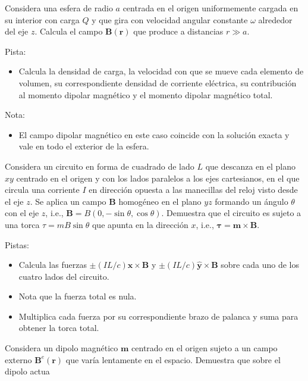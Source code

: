 \documentclass{exam}
\begin{document}
\begin{questions}
\question Considera una esfera de radio $a$ centrada en el origen
  uniformemente cargada en su interior con carga $Q$ y
  que gira con velocidad angular constante $\omega$ alrededor del eje
  $z$. Calcula el campo $\bm B(\bm r)$ que produce a distancias $r\gg
  a$.

  Pista:
  \begin{itemize}
  \item Calcula la densidad de carga, la velocidad con que se mueve
    cada elemento de volumen, su correspondiente densidad de corriente
    eléctrica, su contribución al momento dipolar magnético y el
    momento dipolar magnético total.
  \end{itemize}
  Nota:
  \begin{itemize}
  \item El campo dipolar magnético en este caso coincide con la
    solución exacta y vale en todo el exterior de la esfera.
  \end{itemize}

\question Considera un circuito en forma de cuadrado de lado $L$ que
  descanza en el plano $xy$ centrado en el origen y con los lados
  paralelos a los ejes cartesianos, en el que circula una corriente
  $I$ en dirección opuesta a las manecillas del reloj visto desde el
  eje $z$.
  Se aplica un campo $\bm B$ homogéneo en el plano $yz$ formando
  un ángulo $\theta$ con el eje $z$, i.e., $\bm B=B(0,-\sin\theta,
  \cos\theta)$. Demuestra que el circuito es sujeto a una torca
  $\tau=mB\sin\theta$ que apunta en la dirección $x$, i.e., $\bm
  \tau=\bm m\times\bm B$.

  Pistas:
  \begin{itemize}
  \item Calcula las fuerzas $\pm (IL/c)\hat{\bm x}\times \bm B$  y $\pm
    (IL/c)\hat{\bm y}\times \bm B$ sobre cada uno de los cuatro lados
    del circuito.
  \item Nota que la fuerza total es nula.
  \item Multiplica cada fuerza por su correspondiente brazo de
    palanca y suma para obtener la torca total.
  \end{itemize}


\question Considera un dipolo magnético $\bm m$ centrado en el origen
  sujeto a un campo externo $\bm B^e(\bm r)$ que varía lentamente en
  el espacio. Demuestra que sobre el dipolo actua
\end{questions}
\end{document}
